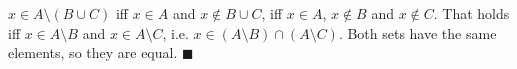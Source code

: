 $x\in A\setminus(B\cup C)$ iff $x\in A$ and $x\notin B\cup C$, iff $x\in A$, $x\notin B$ and $x\notin C$. That holds iff $x\in A\setminus B$ and $x\in A\setminus C$, i.e. $x\in(A\setminus B)\cap(A\setminus C)$. Both sets have the same elements, so they are equal. $\blacksquare$
